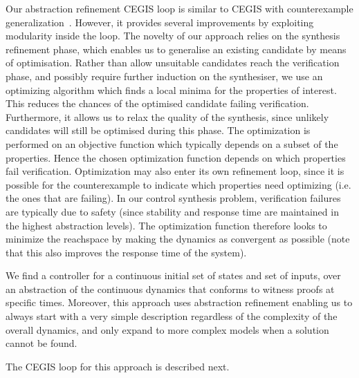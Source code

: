 \documentclass[sigconf]{llncs}
\begin{document}
Our abstraction refinement CEGIS loop is similar to CEGIS with counterexample generalization~\cite{david2017program}.
However, it provides several improvements by exploiting modularity inside the loop.
The novelty of our approach relies on the synthesis refinement phase, which
enables us to generalise an existing candidate by means of optimisation. Rather
than allow unsuitable candidates reach the verification phase, and possibly
require further induction on the synthesiser, we use an optimizing algorithm
which finds a local minima for the properties of interest.  This reduces the
chances of the optimised candidate failing verification.  Furthermore, it
allows us to relax the quality of the synthesis, since unlikely candidates will
still be optimised during this phase. 
The optimization is performed on an objective function which typically depends
on a subset of the properties.  Hence the chosen optimization function depends
on which properties fail verification. Optimization may also enter its own
refinement loop, since it is possible for the counterexample to indicate which
properties need optimizing (i.e. the ones that are failing).
In our control synthesis problem, verification failures are typically due to
safety (since stability and response time are maintained in the highest
abstraction levels).  The optimization function therefore looks to minimize
the reachspace by making the dynamics as convergent as possible (note that
this also improves the response time of the system).
 
We find a controller for a continuous initial set of states and set of inputs,
over an abstraction of the continuous dynamics \cite{cattaruzza2015unbounded}
that conforms to witness proofs at specific times.
Moreover, this approach uses abstraction refinement enabling us to always
start with a very simple description regardless of the complexity of the
overall dynamics, and only expand to more complex models when a solution
cannot be found.

The CEGIS loop for this approach is described next.
\end{document}
